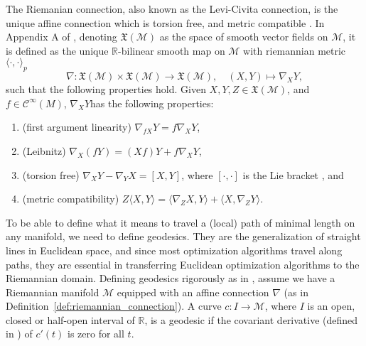 \begin{definition}\label{def:riemannian_connection}
    The \textup{Riemanian connection}, also known as the \textup{Levi-Civita connection}, is the unique affine connection which is torsion free, and metric compatible \cite[Def.~6.4]{Tu2017}. In Appendix A of \cite{JensenZimmermann2024}, denoting $\mathfrak{X}(\mathcal{M})$ as the space of smooth vector fields on $\mathcal{M}$, it is defined as the unique $\mathbb{R}$-bilinear smooth map on $\mathcal{M}$ with riemannian metric $\langle \cdot, \cdot\rangle_{p}$
    \begin{equation*}
        \nabla\colon \mathfrak{X}(\mathcal{M})\times \mathfrak{X}(\mathcal{M})\xrightarrow{}\mathfrak{X}(\mathcal{M}),\quad (X,Y)\mapsto \nabla_{X}Y,
    \end{equation*}
    such that the following properties hold. Given $X,Y,Z\in \mathfrak{X}(\mathcal{M})$, and $f\in \mathcal{C}^{\infty}(M)$, $\nabla_{X}Y$has the following properties:
    \begin{enumerate}
        \item (first argument linearity) $\nabla_{fX}Y=f \nabla_{X}Y$, 
        \item (Leibnitz) $\nabla_{X}(fY)=(Xf)Y+f \nabla_{X}Y$, 
        \item (torsion free) $\nabla_{X}Y-\nabla_{Y}X=[X,Y]$, where $[\cdot,\cdot]$ is the Lie bracket \cite[p.~186]{Lee2012:1}, and
        \item (metric compatibility) $Z \langle X,Y\rangle=\langle \nabla_{Z}X,Y\rangle+\langle X,\nabla_{Z}Y\rangle$.
    \end{enumerate}
\end{definition}

\begin{definition}[Geodesics]\label{def:geodesic}
    To be able to define what it means to travel a (local) path of minimal length on any manifold, we need to define geodesics. They are the generalization of straight
    lines in Euclidean space, and since most optimization algorithms travel along paths, they are essential in transferring Euclidean optimization algorithms to the Riemannian domain. Defining geodesics rigorously as in \cite[Def.~14.1]{Tu2017}, assume we have a Riemannian manifold $\mathcal{M}$ equipped with an affine connection $\nabla$ (as in Definition~\ref{def:riemannian_connection}). A curve $c\colon I\to \mathcal{M}$, where $I$ is an open, closed or half-open interval of $\mathbb{R}$, is a \textup{geodesic} if the covariant derivative (defined in \cite[Appendix~A]{JensenZimmermann2024}) of $c'(t)$ is zero for all $t$. 
\end{definition}


